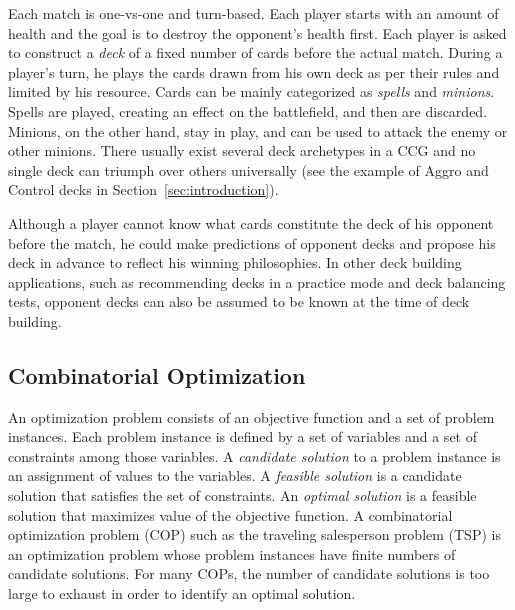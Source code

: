 Each match is one-vs-one and turn-based. Each player starts with an amount of health and the goal is to destroy the opponent's health first. Each player is asked to construct a \textit{deck} of a fixed number of cards before the actual match. During a player's turn, he plays the cards drawn from his own deck as per their rules and limited by his resource. Cards can be mainly categorized as \textit{spells} and \textit{minions}. Spells are played, creating an effect on the battlefield, and then are discarded. Minions, on the other hand, stay in play, and can be used to attack the enemy or other minions. There usually exist several deck archetypes in a CCG and no single deck can triumph over others universally (see the example of Aggro and Control decks in Section~\ref{sec:introduction}). 


Although a player cannot know what cards constitute the deck of his opponent before the match, he could make predictions of opponent decks and propose his deck in advance to reflect his winning philosophies. In other deck building applications, such as recommending decks in a practice mode and deck balancing tests, opponent decks can also be assumed to be known at the time of deck building.


\subsection{Combinatorial Optimization}

An optimization problem consists of an objective function and a set of problem instances. Each problem instance is defined by a set of variables and a set of constraints among those variables. A \textit{candidate solution} to a problem instance is an assignment of values to the variables. A \textit{feasible solution} is a candidate solution that satisfies the set of constraints. An \textit{optimal solution} is a feasible solution that maximizes value of the objective function. A combinatorial optimization problem (COP) such as the traveling salesperson problem (TSP) is an optimization problem whose problem instances have finite numbers of candidate solutions. For many COPs, the number of candidate solutions is too large to exhaust in order to identify an optimal solution. 

